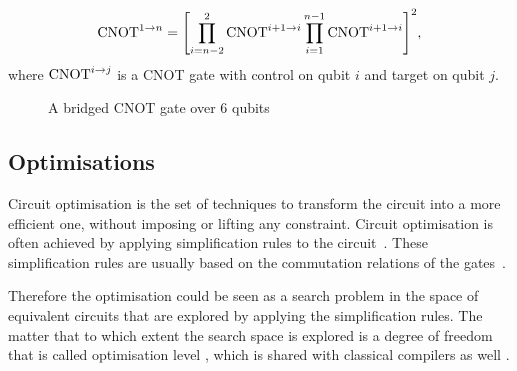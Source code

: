 \begin{equation}
  \label{eq:bridged-cnot-m-n}
  \operatorname{CNOT}^{1\to n} = \qty[\prod_{i=n - 2}^{2}\operatorname{CNOT}^{i + 1\to i} \prod_{i=1}^{n - 1}\operatorname{CNOT}^{i + 1\to i}]^2,
\end{equation}
where $\operatorname{CNOT}^{i\to j}$ is a CNOT gate with control on qubit $i$ and target on qubit $j$.

\begin{figure}[h!]
  \label{fig:bridged-cnot-m-n}
  \centering
  \caption{A bridged CNOT gate over 6 qubits}
\end{figure}

\subsection{Optimisations}

Circuit optimisation is the set of techniques to transform the circuit into a more efficient one, without imposing or lifting any constraint. Circuit optimisation is often achieved by applying simplification rules to the circuit~\cite{pointing2021}. These simplification rules are usually based on the commutation relations of the gates~\cite{itoko2019,qiskit2023,sivarajah2021}.

Therefore the optimisation could be seen as a search problem in the space of equivalent circuits that are explored by applying the simplification rules. The matter that to which extent the search space is explored is a degree of freedom that is called optimisation level \cite{qiskit2023,sivarajah2021}, which is shared with classical compilers as well \cite{aho1986}.